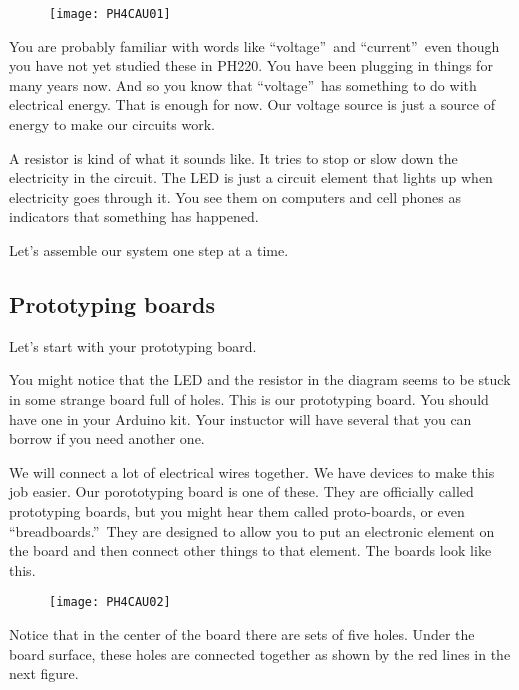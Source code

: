 \begin{figure}[h!]
	\centering
	\texttt{[image: PH4CAU01]}
\end{figure}

You are probably familiar with
words like \textquotedblleft voltage\textquotedblright\ and
\textquotedblleft current\textquotedblright\ even though you have not yet
studied these in PH220. You have been plugging in things for many years now.
And so you know that \textquotedblleft voltage\textquotedblright\ has
something to do with electrical energy. That is enough for now. Our voltage
source is just a source of energy to make our circuits work.

A resistor is kind of what it sounds like. It tries to stop or slow down the
electricity in the circuit. The LED is just a circuit element that lights up
when electricity goes through it. You see them on computers and cell phones
as indicators that something has happened.

Let's assemble our system one step at a time.

\subsection{Prototyping boards}

Let's start with your prototyping board.

You might notice that the LED and the resistor in the diagram seems to be
stuck in some strange board full of holes. This is our prototyping board.
You should have one in your Arduino kit. Your instuctor will have several
that you can borrow if you need another one.

We will connect a lot of electrical wires together. We have devices to make
this job easier. Our porototyping board is one of these. They are officially
called prototyping boards, but you might hear them called proto-boards, or
even \textquotedblleft breadboards.\textquotedblright\ They are designed to
allow you to put an electronic element on the board and then connect other
things to that element. The boards look like this. 

\begin{figure}[h!]
	\centering
	\texttt{[image: PH4CAU02]}
\end{figure}

Notice that in the center of the board there are sets of five holes. Under
the board surface, these holes are connected together as shown by the red
lines in the next figure. 

